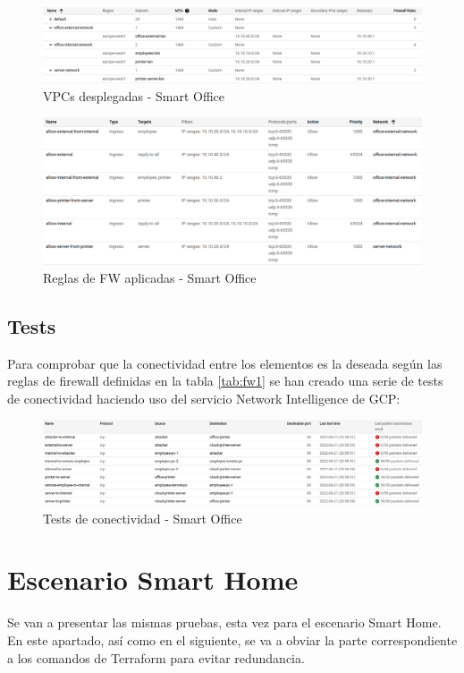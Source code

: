   \begin{figure}[h]
  \centering
  \includegraphics[width=\textwidth]{../imgs/desarrollo/resultados/so/vpcs.png}
  \caption{VPCs desplegadas - Smart Office}
  \end{figure}

  \begin{figure}[h]
  \centering
  \includegraphics[width=\textwidth]{../imgs/desarrollo/resultados/so/fws.png}
  \caption{Reglas de FW aplicadas - Smart Office}
  \end{figure}
  \clearpage

\subsection{Tests}
  Para comprobar que la conectividad entre los elementos es la deseada según las reglas de firewall definidas en la tabla \ref{tab:fw1} se han creado una serie de tests de conectividad haciendo uso del servicio Network Intelligence de GCP:
  
  \begin{figure}[h]
  \centering
  \includegraphics[width=\textwidth]{../imgs/desarrollo/resultados/so/tests.png}
  \caption{Tests de conectividad - Smart Office}
  \end{figure}

\section{Escenario Smart Home}
  Se van a presentar las mismas pruebas, esta vez para el escenario Smart Home. En este apartado, así como en el siguiente, se va a obviar la parte correspondiente a los comandos de Terraform para evitar redundancia. 

